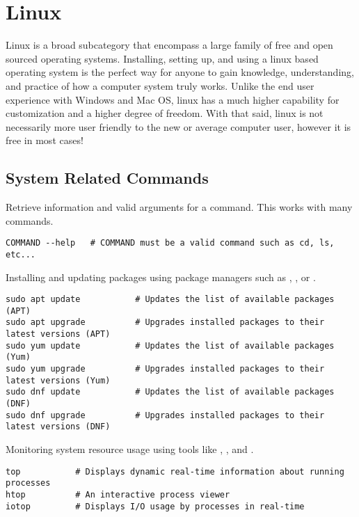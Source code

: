 \chapter{Linux}
\thispagestyle{fancy}
\lstset{language=Bash, style=terminalstyle}

Linux is a broad subcategory that encompass a large family of free and open sourced operating systems. Installing, setting up, and using a linux based operating system is the perfect way for anyone to gain knowledge, understanding, and practice of how a computer system truly works. Unlike the end user experience with Windows and Mac OS, linux has a much higher capability for customization and a higher degree of freedom. With that said, linux is not necessarily more user friendly to the new or average computer user, however it is free in most cases!

\section{System Related Commands}

Retrieve information and valid arguments for a command. This works with many commands.
\begin{lstlisting}
COMMAND --help   # COMMAND must be a valid command such as cd, ls, etc...
\end{lstlisting}

Installing and updating packages using package managers such as , , or .
\begin{lstlisting}
sudo apt update           # Updates the list of available packages (APT)
sudo apt upgrade          # Upgrades installed packages to their latest versions (APT)
sudo yum update           # Updates the list of available packages (Yum)
sudo yum upgrade          # Upgrades installed packages to their latest versions (Yum)
sudo dnf update           # Updates the list of available packages (DNF)
sudo dnf upgrade          # Upgrades installed packages to their latest versions (DNF)
\end{lstlisting}

Monitoring system resource usage using tools like , , and .
\begin{lstlisting}
top           # Displays dynamic real-time information about running processes
htop          # An interactive process viewer
iotop         # Displays I/O usage by processes in real-time
\end{lstlisting}

